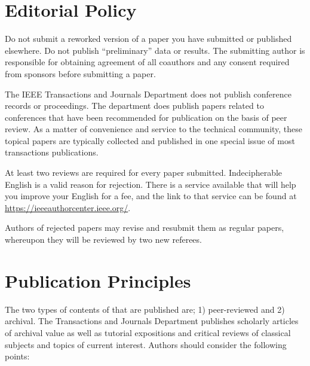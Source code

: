 \documentclass[journal]{IEEEtranTICPS}
\begin{document}
\section{Editorial Policy}

Do not submit a reworked version of a paper you have submitted or published elsewhere. Do not publish ``preliminary'' data or results. The submitting author is responsible for obtaining agreement of all coauthors and any consent required from sponsors before submitting a paper.

The IEEE Transactions and Journals Department does not publish conference records or proceedings. The department  does publish papers related to conferences that have been recommended for publication on the basis of peer review. As a matter of convenience and service to the technical community, these topical papers are typically collected and published in one special issue of most transactions publications.

At least two reviews are required for every paper submitted. Indecipherable English is a valid reason for rejection. There is a service available that will help you improve your English for a fee, and the link to that service can be found at \url{https://ieeeauthorcenter.ieee.org/}.

Authors of rejected papers may revise and resubmit them as regular papers, whereupon they will be reviewed by two new referees.

\section{Publication Principles}

The two types of contents of that are published are; 1) peer-reviewed and 2) archival. The Transactions and Journals Department publishes scholarly articles of archival value as well as tutorial expositions and critical reviews of classical subjects and topics of current interest.
Authors should consider the following points:
\end{document}
